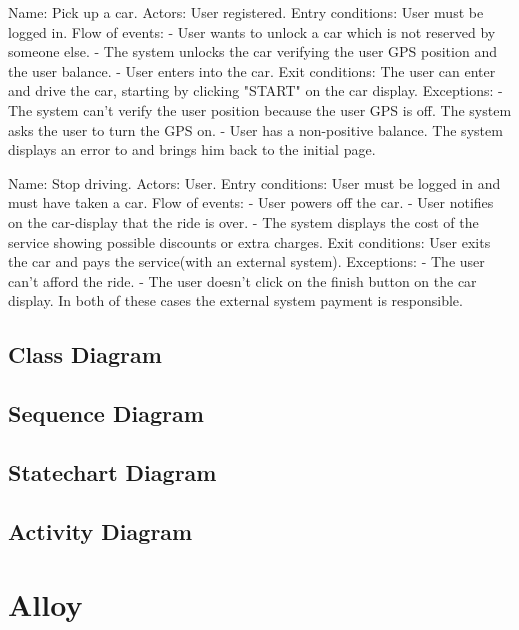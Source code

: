 \documentclass[11pt,a4paper]{report}
\begin{document}
Name: Pick up a car.
Actors: User registered.
Entry conditions: User must be logged in.
Flow of events:
- User wants to unlock a car which is not reserved by someone else.
- The system unlocks the car verifying the user GPS position and the user balance.
- User enters into the car.
Exit conditions: The user can enter and drive the car, starting by clicking "START" on the car display.
Exceptions:
- The system can't verify the user position because the user GPS is off.
The system asks the user to turn the GPS on.
- User has a non-positive balance.
The system displays an error to and brings him back to the initial page.


Name: Stop driving.
Actors: User.
Entry conditions: User must be logged in and must have taken a car.
Flow of events:
- User powers off the car.
- User notifies on the car-display that the ride is over.
- The system displays the cost of the service showing possible discounts or extra charges.
Exit conditions: User exits the car and pays the service(with an external system).
Exceptions:
- The user can't afford the ride.
- The user doesn't click on the finish button on the car display.
In both of these cases the external system payment is responsible.
\subsection{Class Diagram}
\subsection{Sequence Diagram}
\subsection{Statechart Diagram}
\subsection{Activity Diagram}
\section{Alloy}
\end{document}
